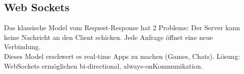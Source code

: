 \subsection{Web Sockets}
Das klassische Model vom Request-Response hat 2 Probleme: Der Server kann keine Nachricht an den Client schicken. Jede Anfrage öffnet eine neue Verbindung.\\
Dieses Model erschwert es real-time Apps zu machen (Games, Chats). Lösung: WebSockets ermöglichen \dq bi-directional\dq, \dq always-on\dq Kommunikation.